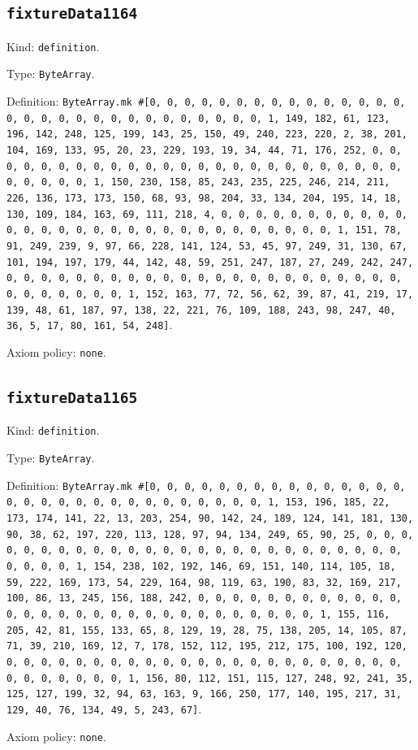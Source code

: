 \documentclass[11pt]{article}
\begin{document}
\subsection*{\texttt{fixtureData1164}}
\noindent Kind: \texttt{definition}.\par
\noindent Type: \texttt{ByteArray}.\par
\noindent Definition: \texttt{ByteArray.mk \#[0, 0, 0, 0, 0, 0, 0, 0, 0, 0, 0, 0, 0, 0, 0, 0, 0, 0, 0, 0, 0, 0, 0, 0, 0, 0, 0, 0, 0, 0, 1, 149, 182, 61, 123, 196, 142, 248, 125, 199, 143, 25, 150, 49, 240, 223, 220, 2, 38, 201, 104, 169, 133, 95, 20, 23, 229, 193, 19, 34, 44, 71, 176, 252, 0, 0, 0, 0, 0, 0, 0, 0, 0, 0, 0, 0, 0, 0, 0, 0, 0, 0, 0, 0, 0, 0, 0, 0, 0, 0, 0, 0, 0, 0, 1, 150, 230, 158, 85, 243, 235, 225, 246, 214, 211, 226, 136, 173, 173, 150, 68, 93, 98, 204, 33, 134, 204, 195, 14, 18, 130, 109, 184, 163, 69, 111, 218, 4, 0, 0, 0, 0, 0, 0, 0, 0, 0, 0, 0, 0, 0, 0, 0, 0, 0, 0, 0, 0, 0, 0, 0, 0, 0, 0, 0, 0, 0, 0, 1, 151, 78, 91, 249, 239, 9, 97, 66, 228, 141, 124, 53, 45, 97, 249, 31, 130, 67, 101, 194, 197, 179, 44, 142, 48, 59, 251, 247, 187, 27, 249, 242, 247, 0, 0, 0, 0, 0, 0, 0, 0, 0, 0, 0, 0, 0, 0, 0, 0, 0, 0, 0, 0, 0, 0, 0, 0, 0, 0, 0, 0, 0, 0, 1, 152, 163, 77, 72, 56, 62, 39, 87, 41, 219, 17, 139, 48, 61, 187, 97, 138, 22, 221, 76, 109, 188, 243, 98, 247, 40, 36, 5, 17, 80, 161, 54, 248]}.\par
\noindent Axiom policy: \texttt{none}.\par
\subsection*{\texttt{fixtureData1165}}
\noindent Kind: \texttt{definition}.\par
\noindent Type: \texttt{ByteArray}.\par
\noindent Definition: \texttt{ByteArray.mk \#[0, 0, 0, 0, 0, 0, 0, 0, 0, 0, 0, 0, 0, 0, 0, 0, 0, 0, 0, 0, 0, 0, 0, 0, 0, 0, 0, 0, 0, 0, 1, 153, 196, 185, 22, 173, 174, 141, 22, 13, 203, 254, 90, 142, 24, 189, 124, 141, 181, 130, 90, 38, 62, 197, 220, 113, 128, 97, 94, 134, 249, 65, 90, 25, 0, 0, 0, 0, 0, 0, 0, 0, 0, 0, 0, 0, 0, 0, 0, 0, 0, 0, 0, 0, 0, 0, 0, 0, 0, 0, 0, 0, 0, 0, 1, 154, 238, 102, 192, 146, 69, 151, 140, 114, 105, 18, 59, 222, 169, 173, 54, 229, 164, 98, 119, 63, 190, 83, 32, 169, 217, 100, 86, 13, 245, 156, 188, 242, 0, 0, 0, 0, 0, 0, 0, 0, 0, 0, 0, 0, 0, 0, 0, 0, 0, 0, 0, 0, 0, 0, 0, 0, 0, 0, 0, 0, 0, 0, 1, 155, 116, 205, 42, 81, 155, 133, 65, 8, 129, 19, 28, 75, 138, 205, 14, 105, 87, 71, 39, 210, 169, 12, 7, 178, 152, 112, 195, 212, 175, 100, 192, 120, 0, 0, 0, 0, 0, 0, 0, 0, 0, 0, 0, 0, 0, 0, 0, 0, 0, 0, 0, 0, 0, 0, 0, 0, 0, 0, 0, 0, 0, 0, 1, 156, 80, 112, 151, 115, 127, 248, 92, 241, 35, 125, 127, 199, 32, 94, 63, 163, 9, 166, 250, 177, 140, 195, 217, 31, 129, 40, 76, 134, 49, 5, 243, 67]}.\par
\noindent Axiom policy: \texttt{none}.\par
\end{document}
